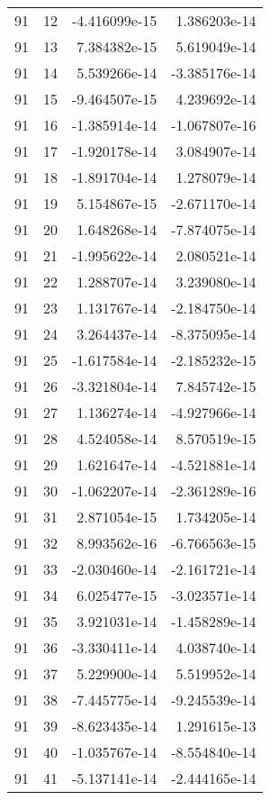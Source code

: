 \begin{tabular}{rrrr}
  91 &   12 & -4.416099e-15 &  1.386203e-14 \\
  91 &   13 &  7.384382e-15 &  5.619049e-14 \\
  91 &   14 &  5.539266e-14 & -3.385176e-14 \\
  91 &   15 & -9.464507e-15 &  4.239692e-14 \\
  91 &   16 & -1.385914e-14 & -1.067807e-16 \\
  91 &   17 & -1.920178e-14 &  3.084907e-14 \\
  91 &   18 & -1.891704e-14 &  1.278079e-14 \\
  91 &   19 &  5.154867e-15 & -2.671170e-14 \\
  91 &   20 &  1.648268e-14 & -7.874075e-14 \\
  91 &   21 & -1.995622e-14 &  2.080521e-14 \\
  91 &   22 &  1.288707e-14 &  3.239080e-14 \\
  91 &   23 &  1.131767e-14 & -2.184750e-14 \\
  91 &   24 &  3.264437e-14 & -8.375095e-14 \\
  91 &   25 & -1.617584e-14 & -2.185232e-15 \\
  91 &   26 & -3.321804e-14 &  7.845742e-15 \\
  91 &   27 &  1.136274e-14 & -4.927966e-14 \\
  91 &   28 &  4.524058e-14 &  8.570519e-15 \\
  91 &   29 &  1.621647e-14 & -4.521881e-14 \\
  91 &   30 & -1.062207e-14 & -2.361289e-16 \\
  91 &   31 &  2.871054e-15 &  1.734205e-14 \\
  91 &   32 &  8.993562e-16 & -6.766563e-15 \\
  91 &   33 & -2.030460e-14 & -2.161721e-14 \\
  91 &   34 &  6.025477e-15 & -3.023571e-14 \\
  91 &   35 &  3.921031e-14 & -1.458289e-14 \\
  91 &   36 & -3.330411e-14 &  4.038740e-14 \\
  91 &   37 &  5.229900e-14 &  5.519952e-14 \\
  91 &   38 & -7.445775e-14 & -9.245539e-14 \\
  91 &   39 & -8.623435e-14 &  1.291615e-13 \\
  91 &   40 & -1.035767e-14 & -8.554840e-14 \\
  91 &   41 & -5.137141e-14 & -2.444165e-14 \\

\end{tabular}
